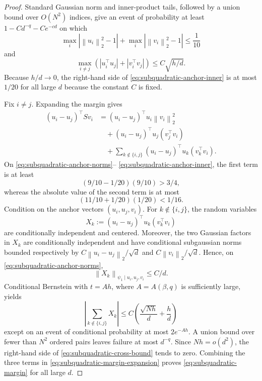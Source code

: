 \documentclass[11pt]{article}
\theoremstyle{definition}
\newcommand{\norm}[1]{\left\lVert #1\right\rVert_2}
\begin{document}
\begin{proof}
Standard Gaussian norm and inner-product tails, followed by a union
bound over $O(N^2)$ indices, give an event of probability at least
$1-Cd^{-q}-Ce^{-cd}$ on which
\begin{equation}
 \max_i\left|\norm{u_i}^2-1\right|
 +\max_i\left|\norm{v_i}^2-1\right|\leq\frac1{10}
 \label{eq:subquadratic-anchor-norms}
\end{equation}
and
\begin{equation}
 \max_{i\neq j}
 \left(|u_i^\top u_j|+|v_i^\top v_j|\right)
 \leq C\sqrt{h/d}.
 \label{eq:subquadratic-anchor-inner}
\end{equation}
Because $h/d\to0$, the right-hand side of
\eqref{eq:subquadratic-anchor-inner} is at most $1/20$ for all large
$d$ because the constant $C$ is fixed.

Fix $i\neq j$.  Expanding the margin gives
\begin{align}
 (u_i-u_j)^\top Sv_i
 &= (u_i-u_j)^\top u_i\norm{v_i}^2
 \nonumber\\
 &\quad +(u_i-u_j)^\top u_j(v_j^\top v_i)
 \nonumber\\
 &\quad +\sum_{k\notin\{i,j\}}
 (u_i-u_j)^\top u_k(v_k^\top v_i).
 \label{eq:subquadratic-margin-expansion}
\end{align}
On \eqref{eq:subquadratic-anchor-norms}--
\eqref{eq:subquadratic-anchor-inner}, the first term is at least
\[
 (9/10-1/20)(9/10)>3/4,
\]
whereas the absolute value of the second term is at most
\[
 (11/10+1/20)(1/20)<1/16.
\]
Condition on the anchor vectors $(u_i,u_j,v_i)$.  For
$k\notin\{i,j\}$, the random variables
\[
 X_k:=(u_i-u_j)^\top u_k(v_k^\top v_i)
\]
are conditionally independent and centered.  Moreover, the two
Gaussian factors in $X_k$ are conditionally independent and have
conditional subgaussian norms bounded respectively by
$C\norm{u_i-u_j}/\sqrt d$ and $C\norm{v_i}/\sqrt d$.  Hence, on
\eqref{eq:subquadratic-anchor-norms},
\[
 \left\lVert X_k\right\rVert_{\psi_1\mid u_i,u_j,v_i}\leq C/d.
\]
Conditional Bernstein with $t=A h$, where
$A=A(\beta,q)$ is sufficiently large, yields
\begin{equation}
 \left|\sum_{k\notin\{i,j\}}X_k\right|
 \leq C\left(\frac{\sqrt{Nh}}d+\frac hd\right)
 \label{eq:subquadratic-cross-bound}
\end{equation}
except on an event of conditional probability at most $2e^{-Ah}$.
A union bound over fewer than $N^2$ ordered pairs leaves failure at most
$d^{-q}$.  Since $Nh=o(d^2)$, the right-hand side of
\eqref{eq:subquadratic-cross-bound} tends to zero.  Combining the three
terms in \eqref{eq:subquadratic-margin-expansion} proves
\eqref{eq:subquadratic-margin} for all large $d$.


\end{proof}
\end{document}
